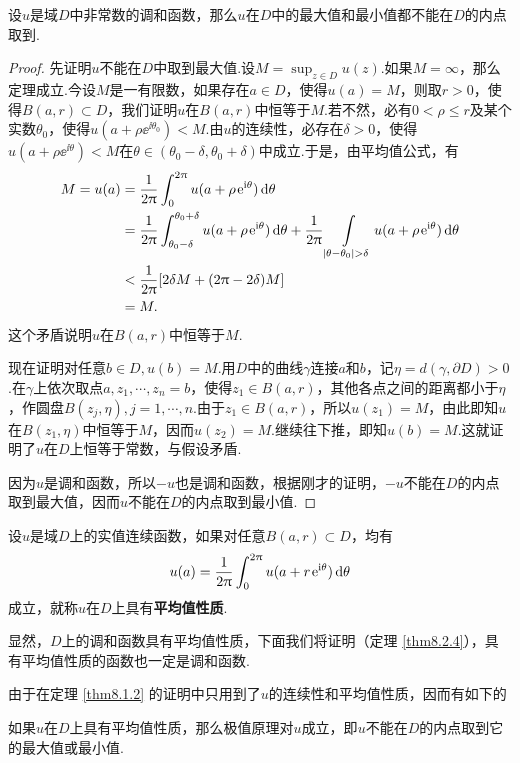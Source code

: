 \begin{theorem}\label{thm8.1.2}
  设$u$是域$D$中非常数的调和函数，那么$u$在$D$中的最大值和最小值都不能在$D$的内点取到.
\end{theorem}
\begin{proof}
  先证明$u$不能在$D$中取到最大值.设$M=\sup_{z\in D}u(z)$.如果$M=\infty$，那么定理成立.今设$M$是一有限数，如果存在$a\in D$，使得$u(a)=M$，则取$r>0$，使得$B(a,r)\subset D$，我们证明$u$在$B(a,r)$中恒等于$M$.若不然，必有$0<\rho\le r$及某个实数$\theta_0$，使得$u(a+\rho\ee^{\ii\theta_0})<M$.由$u$的连续性，必存在$\delta>0$，使得$u(a+\rho\ee^ {\ii\theta})<M$在$\theta\in(\theta_0-\delta,\theta_0+\delta)$中成立.于是，由平均值公式，有
  \begin{align*}
    M = u(a) & = \frac1{2\pi}\int_0^{2\pi}u(a+\rho\ee^{\ii\theta})\dif \theta\\
    & = \frac1{2\pi}\int_{\theta_0-\delta}^{\theta_0+\delta}u(a+\rho\ee^{\ii\theta})
        \dif \theta+\frac1{2\pi}\int\limits_{|\theta-\theta_0|>\delta}
         u(a+\rho\ee^ {\ii\theta})\dif \theta\\
    & < \frac1{2\pi}[2\delta M+(2\pi-2\delta)M]\\
    & = M.
  \end{align*}
  这个矛盾说明$u$在$B(a,r)$中恒等于$M$.

  现在证明对任意$b\in D,u(b)=M$.用$D$中的曲线$\gamma$连接$a$和$b$，记$\eta=d(\gamma,\partial D)>0$.在$\gamma$上依次取点$a,z_1,\cdots,z_n=b$，使得$z_1\in B(a,r)$，其他各点之间的距离都小于$\eta$，作圆盘$B(z_j,\eta),j=1,\cdots,n$.由于$z_1\in B(a,r)$，所以$u(z_1)=M$，由此即知$u$在$B(z_1,\eta)$中恒等于$M$，因而$u(z_2)=M$.继续往下推，即知$u(b)=M$.这就证明了$u$在$D$上恒等于常数，与假设矛盾.

  因为$u$是调和函数，所以$-u$也是调和函数，根据刚才的证明，$-u$不能在$D$的内点取到最大值，因而$u$不能在$D$的内点取到最小值.
\end{proof}

\begin{definition}\label{def8.1.3}
  设$u$是域$D$上的实值连续函数，如果对任意$B(a,r)\subset D$，均有
  \[
    u(a) = \frac1{2\uppi}\int_0^{2\uppi}u(a+r\operatorname{\!\!\;\mathrm e}^{\mathrm i\theta})\mathop{}\!\mathrm{d} \theta
  \]
  成立，就称$u$在$D$上具有\textbf{平均值性质}.
\end{definition}

显然，$D$上的调和函数具有平均值性质，下面我们将证明（定理 \ref{thm8.2.4}），具有平均值性质的函数也一定是调和函数.

由于在定理 \ref{thm8.1.2} 的证明中只用到了$u$的连续性和平均值性质，因而有如下的
\begin{prop}\label{prop8.1.4}
  如果$u$在$D$上具有平均值性质，那么极值原理对$u$成立，即$u$不能在$D$的内点取到它的最大值或最小值.
\end{prop}

